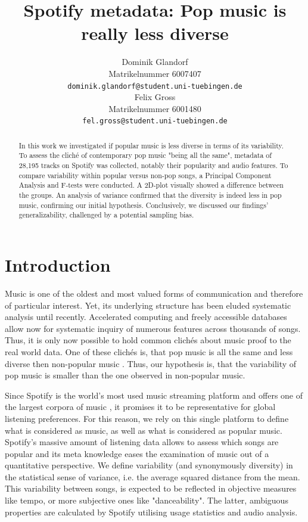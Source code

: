 \documentclass{article}
\title{Spotify metadata: Pop music is really less diverse}
\author{%
  Dominik Glandorf\\
  Matrikelnummer 6007407\\
  \texttt{dominik.glandorf@student.uni-tuebingen.de} \\
  \And
  Felix Gross\\
  Matrikelnummer 6001480\\
  \texttt{fel.gross@student.uni-tuebingen.de} \\
}
\begin{document}
\maketitle

\begin{abstract}
In this work we investigated if popular music is less diverse in terms of its variability.
To assess the cliché of contemporary pop music "being all the same",
metadata of 28,195 tracks on Spotify was collected, notably their popularity and audio features. To compare variability within popular versus non-pop songs, a Principal Component Analysis and F-tests were conducted.
A 2D-plot visually showed a difference between the groups. An analysis of variance confirmed that the diversity is indeed less in pop music, confirming our initial hypothesis.
Conclusively, we discussed our findings' generalizability, challenged by a potential sampling bias. 
\end{abstract}

\section{Introduction}
Music is one of the oldest and most valued forms of communication and therefore of particular interest. Yet, its underlying structure has been eluded systematic analysis until recently.
Accelerated computing and freely accessible databases allow now for systematic inquiry of numerous features across thousands of songs. Thus, it is only now possible to hold common clichés about music proof to the real world data.
One of these clichés is, that pop music is all the same and less diverse then non-popular music \citep{serra2012measuring}. Thus, our hypothesis is, that the variability of pop music is smaller than the one observed in non-popular music.

Since Spotify is the world's most used music streaming platform and offers one of the largest corpora of music \citep{quarterlyReport}, it promises it to be representative for global listening preferences. For this reason, we rely on this single platform to define what is considered as music, as well as what is considered as popular music. Spotify's massive amount of listening data allows to assess which songs are popular and its meta knowledge eases the examination of music out of a quantitative perspective.
We define variability (and synonymously diversity) in the statistical sense of variance, i.e. the average squared distance from the mean. This variability between songs, is expected to be reflected in objective measures like tempo, or more subjective ones like "danceability".  The latter, ambiguous properties  are calculated by Spotify utilising usage statistics and audio analysis.
\end{document}
